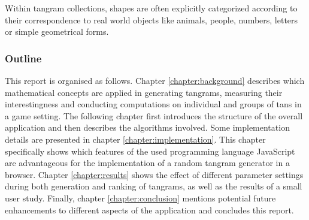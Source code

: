 Within tangram collections, shapes are often explicitly categorized according to their correspondence to real world objects like animals, people, numbers, letters or simple geometrical forms. 


\subsubsection*{Outline}

This report is organised as follows. Chapter \ref{chapter:background} describes which mathematical concepts are applied in generating tangrams, measuring their interestingness and conducting computations on individual and groups of tans in a game setting. The following chapter first introduces the structure of the overall application and then describes the algorithms involved. Some implementation details are presented in chapter \ref{chapter:implementation}. This chapter specifically shows which features of the used programming language JavaScript are advantageous for the implementation of a random tangram generator in a browser. Chapter \ref{chapter:results} shows the effect of different parameter settings during both generation and ranking of tangrams, as well as the results of a small user study. Finally, chapter \ref{chapter:conclusion} mentions potential future enhancements to different aspects of the application and concludes this report.
